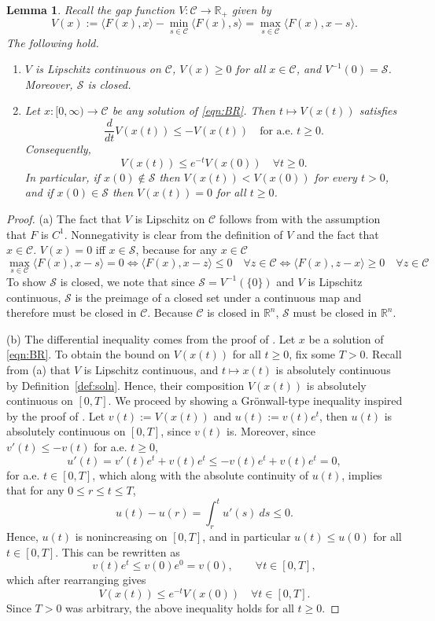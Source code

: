 \documentclass[pdflatex,sn-mathphys-num]{sn-jnl}%
\newcommand\R{\mathbb{R}}
\newcommand\C{\mathcal{C}}
\newcommand\mS{\mathcal{S}}
\theoremstyle{thmstyleone}%
\newtheorem{lemma}[theorem]{Lemma}%
\theoremstyle{thmstyletwo}%
\theoremstyle{thmstylethree}%
\begin{document}
\begin{lemma}\label{lem:Chen}
Recall the gap function $V:\C\to\R_+$ given by
\[
  V(x):= \langle{F(x),x}\rangle -\min_{s\in\C}\langle{F(x),s}\rangle = \max_{s \in \C}\langle{F(x), x - s}\rangle.
\]
The following hold.
\begin{enumerate}[label=(\alph*)]
\item $V$ is Lipschitz continuous on $\C$, $V(x)\geq 0$ for all $x\in\C$, and $V^{-1}(0)=\mS$. Moreover, $\mS$ is closed.
\item Let $x:[0,\infty)\to\C$ be any solution of \eqref{eqn:BR}.
Then $t\mapsto V(x(t))$ satisfies
\[
  \frac{d}{dt}V(x(t)) \leq -V(x(t))\quad \text{for a.e. }t\geq 0.
\]
Consequently,
\[
  V(x(t))\leq e^{-t}V(x(0))\quad\forall t\geq 0.
\]
In particular, if $x(0)\notin \mS$ then $V(x(t)) < V(x(0))$ for every $t>0$,
and if $x(0)\in\mS$ then $V(x(t)) = 0$ for all $t\ge 0$.
\end{enumerate}
\end{lemma}

\begin{proof}
(a) The fact that $V$ is Lipschitz on $\C$ follows from \cite[Theorem~1]{Chen2024} with the assumption that $F$ is $C^1$. Nonnegativity is clear from the definition of $V$ and the fact that $x \in \C$.
$V(x)=0$ iff $x \in \mS$, because for any $x \in \C$
\[
  \max_{s \in \C} \langle{F(x), x - s}\rangle = 0 \iff \langle{F(x), x - z}\rangle\leq 0\quad\forall z \in \C \iff \langle{F(x), z - x}\rangle \geq 0\quad\forall z \in \C
\]
To show $\mS$ is closed, we note that since $\mS = V^{-1}(\{0\})$ and $V$ is Lipschitz continuous,
$\mS$ is the preimage of a closed set under a continuous map and therefore must be closed in $\C$. Because $\C$ is closed in $\R^n$,
$\mS$ must be closed in $\R^n$.

(b) The differential inequality comes from the proof of \cite[Theorem~1]{Chen2024}. Let $x$ be a solution of \eqref{eqn:BR}. To obtain the bound on $V(x(t))$ for all $t \geq 0$, fix some $T > 0$. Recall from (a) 
that $V$ is Lipschitz continuous, and $t \mapsto x(t)$ is absolutely continuous by Definition~\ref{def:soln}. Hence, their composition
$V(x(t))$ is absolutely continuous on $[0,T]$. We proceed by showing a Gr\"onwall-type inequality inspired by the proof of \cite[Theorem~1.12]{Tao2006}.
Let $v(t) := V(x(t))$ and $u(t) := v(t)e^t$, then $u(t)$ is absolutely continuous on $[0,T]$, since $v(t)$ is. Moreover,
since $v'(t) \leq -v(t)$ for a.e. $t \geq 0$,
\[
  u'(t) = v'(t) e^t + v(t)e^t \leq -v(t)e^t + v(t)e^t = 0,
\]
for a.e. $t \in [0,T]$, which along with the absolute continuity of $u(t)$, implies that for any $0 \leq r \leq t \leq T$,
\[
  u(t) - u(r) = \int_r^t u'(s)\ ds \leq 0.
\]
Hence, $u(t)$ is nonincreasing on $[0,T]$, and in particular $u(t) \leq u(0)$ for all $t \in [0,T]$. This can be rewritten as
\[
  v(t)e^t \leq v(0)e^0 = v(0),\qquad \forall t \in [0,T],
\]
which after rearranging gives
\[
  V(x(t))\leq e^{-t}V(x(0))\quad\forall t \in [0,T].
\]
Since $T > 0$ was arbitrary, the above inequality holds for all $t \geq 0$.
\end{proof}
\end{document}
